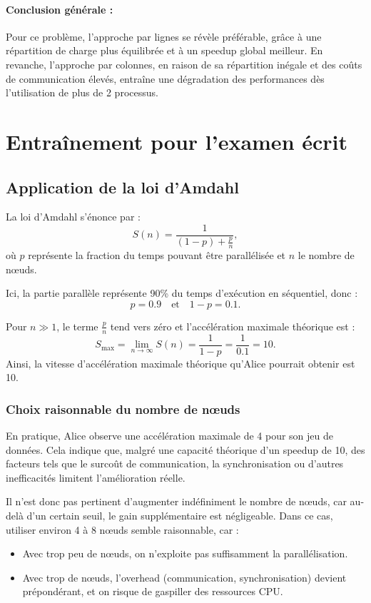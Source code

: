 \documentclass[a4paper,13pt]{book}
\begin{document}
\paragraph{Conclusion générale :} 
Pour ce problème, l'approche par lignes se révèle préférable, grâce à une répartition de charge plus équilibrée et à un speedup global meilleur. En revanche, l'approche par colonnes, en raison de sa répartition inégale et des coûts de communication élevés, entraîne une dégradation des performances dès l'utilisation de plus de 2 processus.

\clearpage
\section{Entraînement pour l'examen écrit}
\subsection{Application de la loi d'Amdahl}

La loi d’Amdahl s’énonce par :
\[
S(n) = \frac{1}{(1-p) + \frac{p}{n}},
\]
où \(p\) représente la fraction du temps pouvant être parallélisée et \(n\) le nombre de nœuds.

Ici, la partie parallèle représente 90\% du temps d’exécution en séquentiel, donc :
\[
p = 0.9 \quad \text{et} \quad 1-p = 0.1.
\]

Pour \( n \gg 1 \), le terme \(\frac{p}{n}\) tend vers zéro et l’accélération maximale théorique est :
\[
S_{\max} = \lim_{n\to\infty} S(n) = \frac{1}{1-p} = \frac{1}{0.1} = 10.
\]
Ainsi, la vitesse d’accélération maximale théorique qu’Alice pourrait obtenir est 10.

\subsubsection{Choix raisonnable du nombre de n\oe uds}

En pratique, Alice observe une accélération maximale de 4 pour son jeu de données. Cela indique que, malgré une capacité théorique d’un speedup de 10, des facteurs tels que le surcoût de communication, la synchronisation ou d’autres inefficacités limitent l’amélioration réelle.

Il n’est donc pas pertinent d’augmenter indéfiniment le nombre de nœuds, car au-delà d’un certain seuil, le gain supplémentaire est négligeable. Dans ce cas, utiliser environ 4 à 8 nœuds semble raisonnable, car :
\begin{itemize}
    \item Avec trop peu de nœuds, on n’exploite pas suffisamment la parallélisation.
    \item Avec trop de nœuds, l’overhead (communication, synchronisation) devient prépondérant, et on risque de gaspiller des ressources CPU.
\end{itemize}
\end{document}
